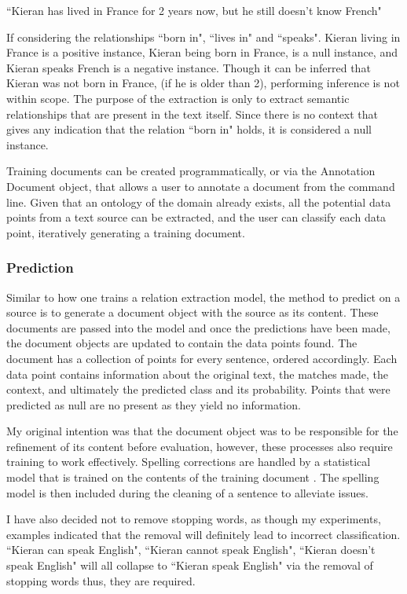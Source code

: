 \documentclass[12pt]{article} %
\begin{document}
\noindent``Kieran has lived in France for 2 years now, but he still doesn’t know French"

If considering the relationships ``born in", ``lives in" and ``speaks". Kieran living in France is a positive instance, Kieran being born in France, is a null instance, and Kieran speaks French is a negative instance. Though it can be inferred that Kieran was not born in France, (if he is older than 2), performing inference is not within scope. The purpose of the extraction is only to extract semantic relationships that are present in the text itself. Since there is no context that gives any indication that the relation ``born in" holds, it is considered a null instance.

Training documents can be created programmatically, or via the Annotation Document object, that allows a user to annotate a document from the command line. Given that an ontology of the domain already exists, all the potential data points from a text source can be extracted, and the user can classify each data point, iteratively generating a training document.

\subsubsection{Prediction}

Similar to how one trains a relation extraction model, the method to predict on a source is to generate a document object with the source as its content. These documents are passed into the model and once the predictions have been made, the document objects are updated to contain the data points found. The document has a collection of points for every sentence, ordered accordingly. Each data point contains information about the original text, the matches made, the context, and ultimately the predicted class and its probability. Points that were predicted as null are no present as they yield no information.

My original intention was that the document object was to be responsible for the refinement of its content before evaluation, however, these processes also require training to work effectively. Spelling corrections are handled by a statistical model that is trained on the contents of the training document \cite{whitelaw2009using}\cite{choudhury2007difficult}. The spelling model is then included during the cleaning of a sentence to alleviate issues. 

I have also decided not to remove stopping words, as though my experiments, examples indicated that the removal will definitely lead to incorrect classification. ``Kieran can speak English", ``Kieran cannot speak English", ``Kieran doesn’t speak English" will all collapse to ``Kieran speak English" via the removal of stopping words thus, they are required.
\end{document}
